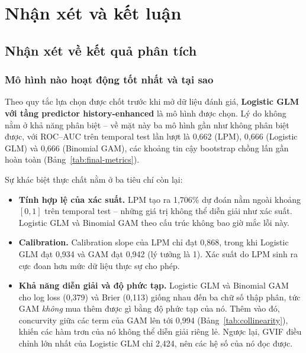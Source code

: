 
\section{Nhận xét và kết luận}

\subsection{Nhận xét về kết quả phân tích}

\subsubsection{Mô hình nào hoạt động tốt nhất và tại sao}

Theo quy tắc lựa chọn được chốt trước khi mở dữ liệu đánh giá,
\textbf{Logistic GLM với tầng predictor history-enhanced} là mô hình được chọn.
Lý do không nằm ở khả năng phân biệt -- về mặt này ba mô hình gần như không phân
biệt được, với ROC--AUC trên temporal test lần lượt là 0,662 (LPM), 0,666
(Logistic GLM) và 0,666 (Binomial GAM), các khoảng tin cậy bootstrap chồng lấn
gần hoàn toàn (Bảng~\ref{tab:final-metrics}).

Sự khác biệt thực chất nằm ở ba tiêu chí còn lại:

\begin{itemize}
  \item \textbf{Tính hợp lệ của xác suất.} LPM tạo ra 1,706\% dự đoán nằm ngoài
  khoảng $[0,1]$ trên temporal test -- những giá trị không thể diễn giải như xác
  suất. Logistic GLM và Binomial GAM theo cấu trúc không bao giờ mắc lỗi này.

  \item \textbf{Calibration.} Calibration slope của LPM chỉ đạt 0,868, trong khi
  Logistic GLM đạt 0,934 và GAM đạt 0,942 (lý tưởng là 1). Xác suất do LPM sinh
  ra cực đoan hơn mức dữ liệu thực sự cho phép.

  \item \textbf{Khả năng diễn giải và độ phức tạp.} Logistic GLM và Binomial GAM
  cho log loss (0,379) và Brier (0,113) giống nhau đến ba chữ số thập phân, tức
  GAM \emph{không} mua thêm được gì bằng độ phức tạp của nó. Thêm vào đó,
  concurvity giữa các term của GAM lên tới 0,994 (Bảng~\ref{tab:collinearity}),
  khiến các hàm trơn của nó không thể diễn giải riêng lẻ. Ngược lại, GVIF điều
  chỉnh lớn nhất của Logistic GLM chỉ 2,424, nên các hệ số của nó đọc được.
\end{itemize}

